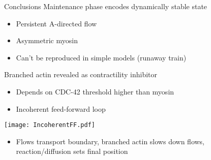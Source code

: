 \documentclass{beamer}
\newcommand{\6}[1]{#1_{\text{6}}}
\newcommand{\3}[1]{#1_{\text{3}}}
\begin{document}
\begin{frame}{Conclusions}
Maintenance phase encodes dynamically stable state
\begin{itemize}
\item Persistent A-directed flow
\item Asymmetric myosin
\item Can't be reproduced in simple models (runaway train)
\end{itemize}
\pause 

Branched actin revealed as contractility inhibitor
\begin{itemize}
\item Depends on CDC-42 threshold higher than myosin
\item Incoherent feed-forward loop
\end{itemize}
\begin{center}
\texttt{[image: IncoherentFF.pdf]}
\end{center}

\pause 
\begin{itemize}
\item Flows transport boundary, branched actin slows down flows, reaction/diffusion sets final position
\end{itemize} 
\end{frame}
\end{document}
